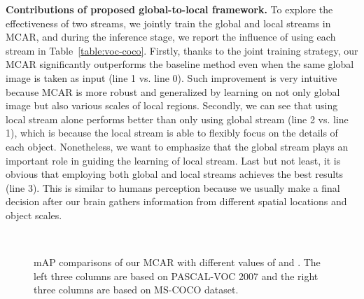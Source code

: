 \documentclass[journal]{IEEEtran}
\begin{document}
\noindent \textbf{Contributions of proposed global-to-local framework.}  
To explore the effectiveness of two streams, we jointly train the global and local streams in MCAR, and during the inference stage, we report the influence of using each stream in Table~\ref{table:voc-coco}. Firstly, thanks to the joint training strategy, our MCAR significantly outperforms the baseline method even when the same global image is taken as input (line 1 vs. line 0). Such improvement is very intuitive because MCAR is more robust and generalized by learning on not only global image but also various scales of local regions. Secondly, we can see that using local stream alone performs better than only using global stream (line 2 vs. line 1), which is because the local stream is able to flexibly focus on the details of each object. Nonetheless, we want to emphasize that the global stream plays an important role in guiding the learning of local stream. Last but not least, it is obvious that employing both global and local streams achieves the best results (line 3). This is similar to humans perception because we usually make a final decision after our brain gathers information from different spatial locations and object scales.

\begin{figure*}[t]
 \centering
 \vspace{-5pt}
 \quad \vrule \quad
  \\
  	\quad \vrule \quad
\caption{mAP comparisons of our MCAR with different values of   and . The left three columns are based on PASCAL-VOC 2007 and the right three columns are based on MS-COCO dataset.} \label{fig:hyperpa}
\vspace{-10pt}\label{fig:topntao}
\end{figure*}
\end{document}
